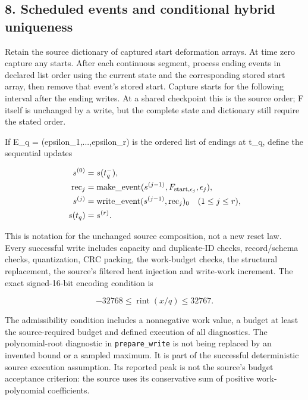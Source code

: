 \documentclass[11pt,a4paper]{article}
\begin{document}
\subsection*{8. Scheduled events and conditional hybrid uniqueness}

Retain the source dictionary of captured start deformation arrays. At time zero capture any starts. After each continuous segment, process ending events in declared list order using the current state and the corresponding stored start array, then remove that event's stored start. Capture starts for the following interval after the ending writes. At a shared checkpoint this is the source order; F itself is unchanged by a write, but the complete state and dictionary still require the stated order.

If E\_q = (epsilon\_1,...,epsilon\_r) is the ordered list of endings at t\_q, define the sequential updates



\[
\begin{aligned}
s^{(0)}&=s(t_q^-),\\
\mathrm{rec}_j&=\mathrm{make\_event}(s^{(j-1)},F_{{\rm start},\epsilon_j},\epsilon_j),\\
s^{(j)}&=\mathrm{write\_event}(s^{(j-1)},\mathrm{rec}_j)_0
\quad(1\le j\le r),\\
s(t_q)&=s^{(r)}.
\end{aligned}
\]



This is notation for the unchanged source composition, not a new reset law. Every successful write includes capacity and duplicate-ID checks, record/schema checks, quantization, CRC packing, the work-budget checks, the structural replacement, the source's filtered heat injection and write-work increment. The exact signed-16-bit encoding condition is



\[
-32768\le\operatorname{rint}(x/q)\le32767.
\]



The admissibility condition includes a nonnegative work value, a budget at least the source-required budget and defined execution of all diagnostics. The polynomial-root diagnostic in \texttt{prepare\_write} is not being replaced by an invented bound or a sampled maximum. It is part of the successful deterministic source execution assumption. Its reported peak is not the source's budget acceptance criterion: the source uses its conservative sum of positive work-polynomial coefficients.
\end{document}
